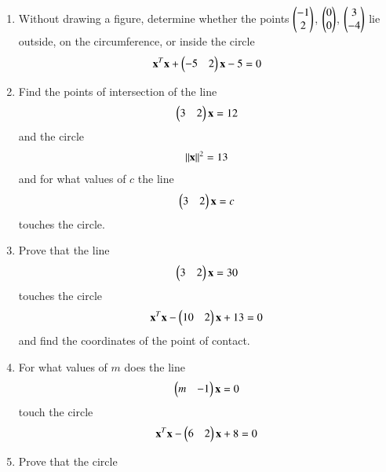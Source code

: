 \renewcommand{\theequation}{\theenumi}
\begin{enumerate}[label=\arabic*.,ref=\thesubsection.\theenumi]
\item Without drawing a figure, determine whether the points $\begin{pmatrix}-1\\2\end{pmatrix}$, $\begin{pmatrix}0\\0\end{pmatrix}$, $\begin{pmatrix}3\\-4\end{pmatrix}$ lie outside, on the circumference, or inside the circle
\begin{align}
\mathbf{x}^T\mathbf{x}+\begin{pmatrix}-5 & 2\end{pmatrix}\mathbf{x}-5 = 0
\end{align}
\solution

\item Find the points of intersection of the line
\begin{align}
    \label{eq:solutions/4/2/2/eq1}\begin{pmatrix}3 & 2\end{pmatrix}\mathbf x = 12
\end{align}
and the circle
\begin{align}
    \label{eq:solutions/4/2/2/eq:circle} \left\lVert\mathbf{x}\right\rVert^2 = 13
\end{align}
and for what values of $c$ the line
\begin{align}
    \label{eq:solutions/4/2/2/tangent}\begin{pmatrix}3 &2\end{pmatrix}\mathbf x = c 
\end{align}
touches the circle.
\\
%
\solution

%
\item Prove that the line 
\begin{align}
\begin{pmatrix}3 &2\end{pmatrix}\mathbf{x}=30 \label{eq:solutions/4/2/3/given_line_eq}
\end{align}
touches the circle
\begin{align}
\mathbf{x}^T\mathbf{x}-\begin{pmatrix}10 & 2\end{pmatrix}\mathbf{x}+13 = 0 \label{eq:solutions/4/2/3/given_circle_eq}
\end{align}
and find the coordinates of the point of contact.
%
\solution

\item For what values of $m$ does the line 
\begin{align}
\begin{pmatrix}m &-1\end{pmatrix}\mathbf{x}=0
\label{eq:solutions/4/2/4/1.1}
\end{align}
touch the circle
\begin{align}
\mathbf{x}^T\mathbf{x}-\begin{pmatrix}6 & 2\end{pmatrix}\mathbf{x}+8 = 0 \label{eq:solutions/4/2/4/1.2}
\end{align}
\solution

\renewcommand{\theequation}{\theenumi}
\item Prove that the circle 

\end{enumerate}
